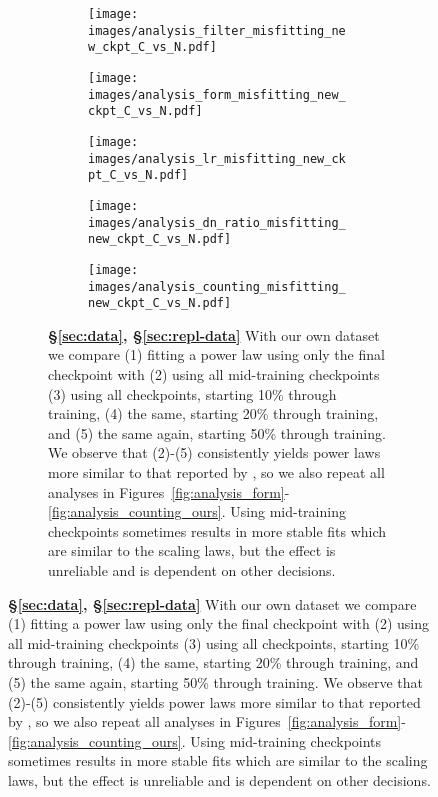 \begin{figure}[]
\ContinuedFloat
\centering 

\begin{subfigure}{\textwidth}
\centering
\begin{subfigure}{0.7\textwidth}
    \centering
    \texttt{[image: images/analysis\_filter\_misfitting\_new\_ckpt\_C\_vs\_N.pdf]}
\end{subfigure}
\vspace{1em}
\begin{subfigure}{0.49\textwidth}
    \centering
    \texttt{[image: images/analysis\_form\_misfitting\_new\_ckpt\_C\_vs\_N.pdf]}
\end{subfigure}
\hfill
\begin{subfigure}{0.49\textwidth}
    \centering
    \texttt{[image: images/analysis\_lr\_misfitting\_new\_ckpt\_C\_vs\_N.pdf]}
\end{subfigure}
\vspace{1em}
\begin{subfigure}{0.49\textwidth}
    \centering
    \texttt{[image: images/analysis\_dn\_ratio\_misfitting\_new\_ckpt\_C\_vs\_N.pdf]}
\end{subfigure}
\hfill
\begin{subfigure}{0.49\textwidth}
    \centering
    \texttt{[image: images/analysis\_counting\_misfitting\_new\_ckpt\_C\_vs\_N.pdf]}
\end{subfigure}


\caption{\textbf{\S\ref{sec:data}, \S\ref{sec:repl-data}} With our own dataset we compare (1) fitting a power law using only the final checkpoint with (2) using all mid-training checkpoints (3) using all checkpoints, starting 10\% through training, (4) the same, starting 20\% through training, and (5) the same again, starting 50\% through training. We observe that (2)-(5) consistently
yields power laws more similar to that reported by \citet{hoffmann2022training}, so we also repeat all analyses in Figures~\ref{fig:analysis_form}-\ref{fig:analysis_counting_ours}. Using mid-training checkpoints sometimes results in more stable fits which are similar to the \citet{hoffmann2022training} scaling laws, but the effect is unreliable and is dependent on other decisions. 
}
\label{fig:analysis_checkpoint_ours}        
\end{subfigure}

\end{figure}
